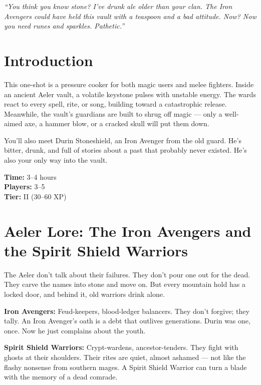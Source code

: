 \documentclass[11pt, a4paper]{article}
\begin{document}



\begin{center}
\textit{``You think you know stone? I've drunk ale older than your clan. The Iron Avengers could have held this vault with a teaspoon and a bad attitude. Now? Now you need runes and sparkles. Pathetic.''}
\end{center}

\section*{Introduction}

This one-shot is a pressure cooker for both magic users and melee fighters. Inside an ancient Aeler vault, a volatile keystone pulses with unstable energy. The wards react to every spell, rite, or song, building toward a catastrophic release. Meanwhile, the vault's guardians are built to shrug off magic --- only a well-aimed axe, a hammer blow, or a cracked skull will put them down.

You'll also meet Durin Stoneshield, an Iron Avenger from the old guard. He's bitter, drunk, and full of stories about a past that probably never existed. He's also your only way into the vault.

\textbf{Time:} 3--4 hours \\
\textbf{Players:} 3--5 \\
\textbf{Tier:} II (30--60 XP)


\section{Aeler Lore: The Iron Avengers and the Spirit Shield Warriors}

The Aeler don't talk about their failures. They don't pour one out for the dead. They carve the names into stone and move on. But every mountain hold has a locked door, and behind it, old warriors drink alone.

\textbf{Iron Avengers:} Feud-keepers, blood-ledger balancers. They don't forgive; they tally. An Iron Avenger's oath is a debt that outlives generations. Durin was one, once. Now he just complains about the youth.

\textbf{Spirit Shield Warriors:} Crypt-wardens, ancestor-tenders. They fight with ghosts at their shoulders. Their rites are quiet, almost ashamed --- not like the flashy nonsense from southern mages. A Spirit Shield Warrior can turn a blade with the memory of a dead comrade.
\end{document}
